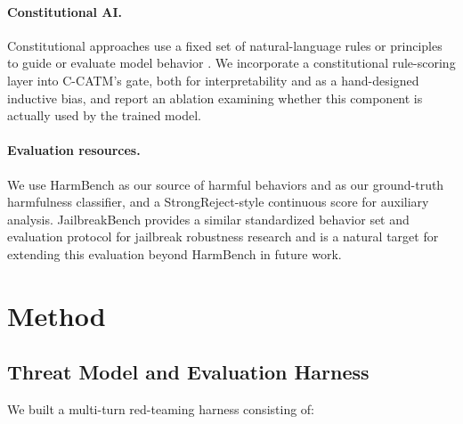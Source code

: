 \documentclass[11pt]{article}
\begin{document}
\paragraph{Constitutional AI.} Constitutional approaches use a fixed set of natural-language rules or principles to guide or evaluate model behavior \citep{bai2022constitutional}. We incorporate a constitutional rule-scoring layer into C-CATM's gate, both for interpretability and as a hand-designed inductive bias, and report an ablation examining whether this component is actually used by the trained model.

\paragraph{Evaluation resources.} We use HarmBench \citep{mazeika2024harmbench} as our source of harmful behaviors and as our ground-truth harmfulness classifier, and a StrongReject-style \citep{souly2024strongreject} continuous score for auxiliary analysis. JailbreakBench \citep{chao2024jailbreakbench} provides a similar standardized behavior set and evaluation protocol for jailbreak robustness research and is a natural target for extending this evaluation beyond HarmBench in future work.

\section{Method}

\subsection{Threat Model and Evaluation Harness}

We built a multi-turn red-teaming harness consisting of:
\end{document}
